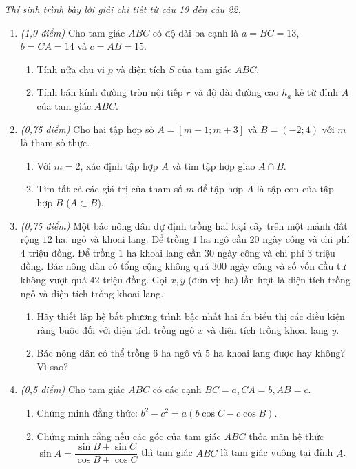\documentclass[12pt,a4paper]{article}
\newcommand{\parttitle}[1]{\par\vspace{2pt}{\large\bfseries\color{ink}#1}\par\vspace{1pt}}
\begin{document}
\parttitle{PHẦN IV. Tự luận}
\textit{Thí sinh trình bày lời giải chi tiết từ câu 19 đến câu 22.}
\begin{enumerate}[resume]
\item \textit{(1,0 điểm)} Cho tam giác $ABC$ có độ dài ba cạnh là $a = BC = 13$, $b = CA = 14$ và $c = AB = 15$.
\begin{enumerate}
    \item Tính nửa chu vi $p$ và diện tích $S$ của tam giác $ABC$.
    \item Tính bán kính đường tròn nội tiếp $r$ và độ dài đường cao $h_a$ kẻ từ đỉnh $A$ của tam giác $ABC$.
\end{enumerate}

\item \textit{(0,75 điểm)} Cho hai tập hợp số $A = [m - 1; m + 3]$ và $B = (-2; 4)$ với $m$ là tham số thực.
\begin{enumerate}
    \item Với $m = 2$, xác định tập hợp $A$ và tìm tập hợp giao $A \cap B$.
    \item Tìm tất cả các giá trị của tham số $m$ để tập hợp $A$ là tập con của tập hợp $B$ ($A \subset B$).
\end{enumerate}

\item \textit{(0,75 điểm)} Một bác nông dân dự định trồng hai loại cây trên một mảnh đất rộng $12\text{ ha}$: ngô và khoai lang. Để trồng $1\text{ ha}$ ngô cần $20$ ngày công và chi phí $4$ triệu đồng. Để trồng $1\text{ ha}$ khoai lang cần $30$ ngày công và chi phí $3$ triệu đồng. Bác nông dân có tổng cộng không quá $300$ ngày công và số vốn đầu tư không vượt quá $42$ triệu đồng. Gọi $x, y$ (đơn vị: ha) lần lượt là diện tích trồng ngô và diện tích trồng khoai lang.
\begin{enumerate}
    \item Hãy thiết lập hệ bất phương trình bậc nhất hai ẩn biểu thị các điều kiện ràng buộc đối với diện tích trồng ngô $x$ và diện tích trồng khoai lang $y$.
    \item Bác nông dân có thể trồng $6\text{ ha}$ ngô và $5\text{ ha}$ khoai lang được hay không? Vì sao?
\end{enumerate}

\item \textit{(0,5 điểm)} Cho tam giác $ABC$ có các cạnh $BC = a, CA = b, AB = c$.
\begin{enumerate}
    \item Chứng minh đẳng thức: $b^2 - c^2 = a(b \cos C - c \cos B)$.
    \item Chứng minh rằng nếu các góc của tam giác $ABC$ thỏa mãn hệ thức $\sin A = \dfrac{\sin B + \sin C}{\cos B + \cos C}$ thì tam giác $ABC$ là tam giác vuông tại đỉnh $A$.
\end{enumerate}
\end{enumerate}
\end{document}
